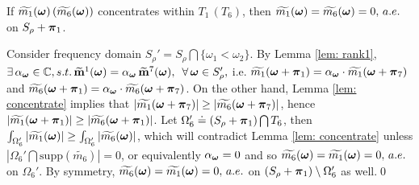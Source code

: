 \begin{proposition}\label{prop: zero-corner}
If  $\widetilde{m_{1}}(\boldsymbol{\omega})\,(\widetilde{m_{6}}(\boldsymbol{\omega}))$ concentrates within $T_1\,(T_6)$, then $\widetilde{m_{1}}(\boldsymbol{\omega}) = \widetilde{m_{6}}(\boldsymbol{\omega}) = 0,\, a.e. $ on $ S_\rho + \boldsymbol{\pi}_1$.
\end{proposition}
Consider frequency domain $S_\rho' = S_\rho\bigcap\{\omega_1<\omega_2\}.$ By Lemma \ref{lem: rank1}, $\exists\,\alpha_{\boldsymbol{\omega}}\in\mathbb{C}, s.t.\,\widetilde{\mathbf{m}}^{1}(\boldsymbol{\omega}) = \alpha_{\boldsymbol{\omega}}\,\widetilde{\mathbf{m}}^{7}(\boldsymbol{\omega}),\,$ $\forall\, \boldsymbol{\omega}\in S_\rho',$ i.e. $\widetilde{m_1}(\boldsymbol{\omega} + \boldsymbol{\pi}_1) = \alpha_{\boldsymbol{\omega}}\cdot\widetilde{m_1}(\boldsymbol{\omega} + \boldsymbol{\pi}_7)$ and $\widetilde{m_6}(\boldsymbol{\omega} + \boldsymbol{\pi}_1) = \alpha_{\boldsymbol{\omega}}\cdot\widetilde{m_6}(\boldsymbol{\omega} + \boldsymbol{\pi}_7)$. On the other hand, Lemma \ref{lem: concentrate} implies that $|\widetilde{m_1}(\boldsymbol{\omega} + \boldsymbol{\pi}_7)| \geq |\widetilde{m_6}(\boldsymbol{\omega} + \boldsymbol{\pi}_7)|$, hence $|\widetilde{m_1}(\boldsymbol{\omega} + \boldsymbol{\pi}_1)| \geq |\widetilde{m_6}(\boldsymbol{\omega} + \boldsymbol{\pi}_1)|$. Let $\Omega_6'\doteq (S_\rho+\boldsymbol{\pi}_1)\bigcap T_6$, then $\int_{\Omega_6'}|\widetilde{m_{1}}(\boldsymbol{\omega})| \geq\int_{\Omega_6'}|\widetilde{m_{6}}(\boldsymbol{\omega})|$, which will contradict Lemma \ref{lem: concentrate} unless $|\Omega_6'\bigcap\text{supp}(\widetilde{m_6})| = 0$, or equivalently $\alpha_{\boldsymbol{\omega}}=0$ and so $\widetilde{m_{6}}(\boldsymbol{\omega}) = \widetilde{m_{1}}(\boldsymbol{\omega}) = 0,\,a.e.$ on $\Omega_6'$. By symmetry, $\widetilde{m_{6}}(\boldsymbol{\omega})=\widetilde{m_{1}}(\boldsymbol{\omega}) = 0,\,a.e. $ on $(S_\rho+\boldsymbol{\pi}_1)\setminus \Omega_6'$ as well.\qed

